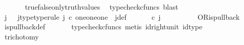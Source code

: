 \begin{isabellebody}
\ \ \ \ \isamarkupfalse%
\ \ true{\isacharunderscore}{\kern0pt}false{\isacharunderscore}{\kern0pt}only{\isacharunderscore}{\kern0pt}truth{\isacharunderscore}{\kern0pt}values\ \isamarkupfalse%
\ {\isacharparenleft}{\kern0pt}typecheck{\isacharunderscore}{\kern0pt}cfuncs{\isacharcomma}{\kern0pt}\ blast{\isacharparenright}{\kern0pt}\isanewline
\ \ \isamarkupfalse%
\ \isamarkupfalse%
\ j\ \ \ j{\isacharunderscore}{\kern0pt}type{\isacharbrackleft}{\kern0pt}type{\isacharunderscore}{\kern0pt}rule{\isacharbrackright}{\kern0pt}{\isacharcolon}{\kern0pt}\ {\isachardoublequoteopen}j\ {\isasymin}\isactrlsub c\ one{\isasymCoprod}{\isacharparenleft}{\kern0pt}one{\isasymCoprod}one{\isacharparenright}{\kern0pt}{\isachardoublequoteclose}\ \ j{\isacharunderscore}{\kern0pt}def{\isacharcolon}{\kern0pt}\ {\isachardoublequoteopen}{\isacharparenleft}{\kern0pt}{\isasymlangle}{\isasymt}{\isacharcomma}{\kern0pt}\ {\isasymt}{\isasymrangle}{\isasymamalg}\ {\isacharparenleft}{\kern0pt}{\isasymlangle}{\isasymt}{\isacharcomma}{\kern0pt}\ {\isasymf}{\isasymrangle}\ {\isasymamalg}{\isasymlangle}{\isasymf}{\isacharcomma}{\kern0pt}\ {\isasymt}{\isasymrangle}{\isacharparenright}{\kern0pt}{\isacharparenright}{\kern0pt}\ {\isasymcirc}\isactrlsub c\ j\ \ {\isacharequal}{\kern0pt}\ {\isasymlangle}{\isasymf}{\isacharcomma}{\kern0pt}{\isasymf}{\isasymrangle}{\isachardoublequoteclose}\isanewline
\ \ \ \ \isamarkupfalse%
\ \ OR{\isacharunderscore}{\kern0pt}is{\isacharunderscore}{\kern0pt}pullback\ \isamarkupfalse%
\ is{\isacharunderscore}{\kern0pt}pullback{\isacharunderscore}{\kern0pt}def\ \isanewline
\ \ \ \ \isamarkupfalse%
\ {\isacharparenleft}{\kern0pt}typecheck{\isacharunderscore}{\kern0pt}cfuncs{\isacharcomma}{\kern0pt}\ metis\ id{\isacharunderscore}{\kern0pt}right{\isacharunderscore}{\kern0pt}unit{}\ id{\isacharunderscore}{\kern0pt}type{\isacharparenright}{\kern0pt}\isanewline
\ \ \isamarkupfalse%
\ trichotomy{\isacharcolon}{\kern0pt}\ {\isachardoublequoteopen}{\isacharparenleft}{\kern0pt}{\isasymlangle}{\isasymt}{\isacharcomma}{\kern0pt}\ {\isasymt}{\isasymrangle}\ {\isacharequal}{\kern0pt}\ {\isasymlangle}{\isasymf}{\isacharcomma}{\kern0pt}{\isasymf}{\isasymrangle}{\isacharparenright}{\kern0pt}\ {\isasymor}\ {\isacharparenleft}{\kern0pt}{\isacharparenleft}{\kern0pt}{\isasymlangle}{\isasymt}{\isacharcomma}{\kern0pt}\ {\isasymf}{\isasymrangle}\ {\isacharequal}{\kern0pt}\ {\isasymlangle}{\isasymf}{\isacharcomma}{\kern0pt}{\isasymf}{\isasymrangle}{\isacharparenright}{\kern0pt}\ {\isasymor}\ {\isacharparenleft}{\kern0pt}{\isasymlangle}{\isasymf}{\isacharcomma}{\kern0pt}\ {\isasymt}{\isasymrangle}\ {\isacharequal}{\kern0pt}\ {\isasymlangle}{\isasymf}{\isacharcomma}{\kern0pt}{\isasymf}{\isasymrangle}{\isacharparenright}{\kern0pt}{\isacharparenright}{\kern0pt}{\isachardoublequoteclose}\isanewline

\end{isabellebody}
